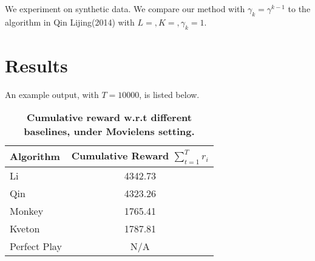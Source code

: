 \documentclass[a4paper,11pt]{article}
\begin{document}
We experiment on synthetic data. We compare our method with $\gamma_k = \gamma^{k-1}$ to the algorithm in Qin Lijing(2014) with $L= , K= , \gamma_k=1$.

\section{Results}

An example output, with $T=10000$, is listed below.

\begin{table}
    \centering
    \renewcommand{\arraystretch}{1.2}
	\begin{tabular}{lc}
	    \toprule
		\textbf{Algorithm}  &\textbf{Cumulative Reward $\sum_{t=1}^Tr_i $}\\
		\midrule
		Li		    &4342.73 \\
		Qin		    &4323.26 \\
		Monkey		    &1765.41 \\
		Kveton		    &1787.81 \\
		Perfect Play		    &N/A \\
		\bottomrule
	\end{tabular}
	\caption{\textbf{Cumulative reward w.r.t different baselines, under Movielens setting.}}
	\label{daily}
\end{table}
\end{document}
